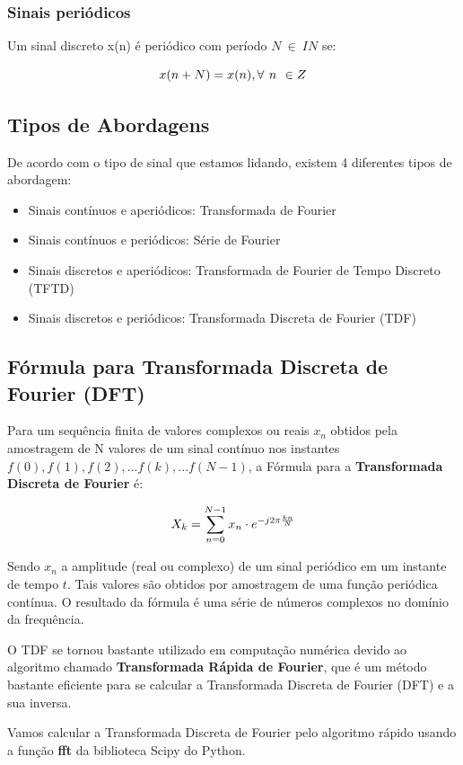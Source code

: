 \subsubsection{Sinais periódicos}
Um sinal discreto x(n) é periódico com período $N \ \in \ IN$ se:

\[ \large x(n + N) = x(n), \forall \ n \ \in Z \]

\subsection {Tipos de Abordagens}

De acordo com o tipo de sinal que estamos lidando, existem 4 diferentes tipos de abordagem:
\begin{itemize}
\item Sinais contínuos e aperiódicos: Transformada de Fourier
\item Sinais contínuos e periódicos: Série de Fourier
\item Sinais discretos e aperiódicos: Transformada de Fourier de Tempo Discreto (TFTD)
\item Sinais discretos e periódicos: Transformada Discreta de Fourier (TDF)
\end{itemize}

\subsection {Fórmula para Transformada Discreta de Fourier (DFT)}
Para um sequência finita de valores complexos ou reais $x_{n}$ obtidos pela amostragem de N valores de um sinal contínuo nos instantes $f(0), f(1), f(2), ... f(k), ... f(N-1)$, a Fórmula para a \textbf{Transformada Discreta de Fourier} é: 

\[ \large X_{k} = \sum_{n = 0}^{N-1} x_{n} \cdot e^{-j2\pi\frac{kn}{N}} \]

Sendo $x_{n}$ a amplitude (real ou complexo) de um sinal periódico em um instante de tempo $t$. Tais valores são obtidos por amostragem de uma função periódica contínua. O resultado da fórmula é uma série de números complexos no domínio da frequência.

O TDF se tornou bastante utilizado em computação numérica devido ao algoritmo chamado \textbf{Transformada Rápida de Fourier}, que é um método bastante eficiente para se calcular a Transformada Discreta de Fourier (DFT) e a sua inversa. 

Vamos calcular a Transformada Discreta de Fourier pelo algoritmo rápido usando a função \textbf{fft} da biblioteca Scipy do Python.

